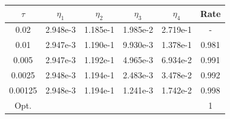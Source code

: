 \mbox{}\\ \\ \\
\begin{center} 
\centering
\begin{tabular}{c|c|c|c|c|c}
$\tau$ & $\eta_1$ & $\eta_2$ & $\eta_3$ & $\eta_4$ & Rate\\\hline
0.02    & 2.948e-3 & 1.185e-1 & 1.985e-2 & 2.719e-1 & -    \\
0.01    & 2.947e-3 & 1.190e-1 & 9.930e-3 & 1.378e-1 & 0.981\\
0.005   & 2.947e-3 & 1.192e-1 & 4.965e-3 & 6.934e-2 & 0.991\\
0.0025  & 2.948e-3 & 1.194e-1 & 2.483e-3 & 3.478e-2 & 0.992\\
0.00125 & 2.948e-3 & 1.194e-1 & 1.241e-3 & 1.742e-2 & 0.998\\\hline
Opt. & & & & & 1
\end{tabular}
 \label{tab:bb_no_transfer_time_est}
\end{center}

